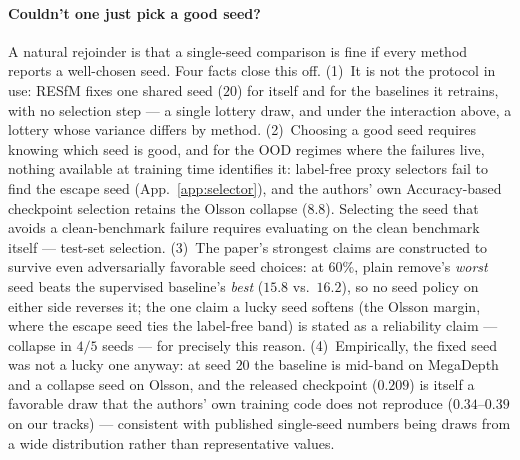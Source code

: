 \documentclass{article}
\begin{document}
\paragraph{Couldn't one just pick a good seed?} A natural rejoinder is that a
single-seed comparison is fine if every method reports a well-chosen seed. Four facts
close this off. (1)~It is not the protocol in use: RESfM fixes one shared seed ($20$)
for itself and for the baselines it retrains, with no selection step --- a single
lottery draw, and under the interaction above, a lottery whose variance differs by
method. (2)~Choosing a good seed requires knowing which seed is good, and for the OOD
regimes where the failures live, nothing available at training time identifies it:
label-free proxy selectors fail to find the escape seed (App.~\ref{app:selector}), and
the authors' own Accuracy-based checkpoint selection retains the Olsson collapse
($8.8$). Selecting the seed that avoids a clean-benchmark failure requires evaluating
on the clean benchmark itself --- test-set selection. (3)~The paper's strongest claims
are constructed to survive even adversarially favorable seed choices: at $60\%$, plain
remove's \emph{worst} seed beats the supervised baseline's \emph{best} ($15.8$ vs.\
$16.2$), so no seed policy on either side reverses it; the one claim a lucky seed
softens (the Olsson margin, where the escape seed ties the label-free band) is stated
as a reliability claim --- collapse in $4/5$ seeds --- for precisely this reason.
(4)~Empirically, the fixed seed was not a lucky one anyway: at seed $20$ the baseline
is mid-band on MegaDepth and a collapse seed on Olsson, and the released checkpoint
($0.209$) is itself a favorable draw that the authors' own training code does not
reproduce ($0.34$--$0.39$ on our tracks) --- consistent with published single-seed
numbers being draws from a wide distribution rather than representative values.
\end{document}
